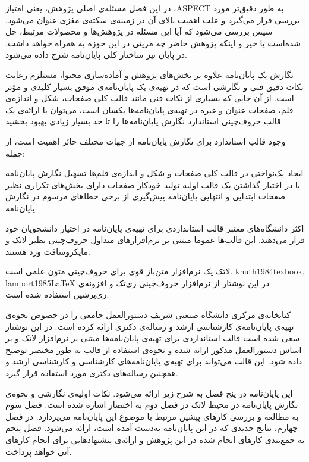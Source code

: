 

در این فصل مسئله‌ی اصلی پژوهش، یعنی امتیاز ،ASPECT به طور دقیق‌تر مورد بررسی قرار می‌گیرد و علت اهمیت بالای آن در زمینه‌ی سکته‌ی مغزی عنوان می‌شود.
سپس بررسی می‌شود که آیا این مسئله در پژوهش‌ها و محصولات مرتبط، حل شده‌است یا خیر و اینکه پژوهش حاضر چه مزیتی در این حوزه به همراه خواهد داشت.
در پایان نیز ساختار کلی پایان‌نامه شرج داده می‌شود.


نگارش یک پایان‌نامه‌ علاوه بر بخش‌های پژوهش و آماده‌سازی محتوا،
مستلزم رعایت نکات دقیق فنی و نگارشی است 
که در تهیه‌ی یک پایان‌نامه‌ی موفق بسیار کلیدی و مؤثر است.
از آن جایی که بسیاری از نکات فنی مانند قالب کلی صفحات، شکل و اندازه‌ی قلم، 
صفحات عنوان و غیره در تهیه‌ی پایان‌نامه‌ها یکسان است،
می‌توان با ارائه‌ی یک قالب حروف‌چینی استاندارد 
نگارش پایان‌نامه‌ها را تا حد بسیار زیادی بهبود بخشید.


وجود قالب استاندارد برای نگارش پایان‌نامه از جهات مختلف حائز اهمیت است، از جمله:

ایجاد یک‌نواختی در قالب کلی صفحات و شکل و اندازه‌ی قلم‌ها
تسهیل نگارش پایان‌نامه با در اختیار گذاشتن یک قالب اولیه 
تولید خودکار صفحات دارای بخش‌های تکراری نظیر صفحات ابتدایی و انتهایی پایان‌نامه
پیش‌گیری از برخی خطاهای مرسوم در نگارش پایان‌نامه


اکثر دانشگاه‌های معتبر قالب استانداردی برای تهیه‌ی پایان‌نامه در اختیار دانشجویان خود قرار می‌دهند.
این قالب‌ها عموما مبتنی بر نرم‌افزارهای متداول حروف‌چینی نظیر لاتک و مایکروسافت ورد هستند.

 لاتک یک نرم‌افزار متن‌باز قوی برای حروف‌چینی متون علمی است.
 {knuth1984texbook, lamport1985LaTeX} 
در این نوشتار از نرم‌افزار حروف‌چینی زی‌تک 
 و افزونه‌ی زی‌پرشین
 استفاده شده است.



کتابخانه‌ی مرکزی دانشگاه صنعتی شریف دستورالعمل جامعی را در خصوص
نحوه‌ی تهیه‌ی پایان‌نامه‌ی کارشناسی ارشد و رساله‌ی دکتری ارائه کرده است.
در این نوشتار سعی شده است قالب استانداردی برای تهیه‌ی پایان‌نامه‌ها مبتنی بر نرم‌افزار لاتک و
بر اساس دستورالعمل مذکور ارائه شده و
نحوه‌ی استفاده از قالب به طور مختصر توضیح داده شود.
این قالب  می‌تواند برای تهیه‌ی پایان‌نامه‌های کارشناسی و کارشناسی ارشد 
و همچنین رساله‌ها‌ی دکتری مورد استفاده قرار گیرد.


این پایان‌نامه در پنج فصل به شرح زیر ارائه می‌شود.
نکات اولیه‌ی نگارشی و نحوه‌ی نگارش پایان‌نامه در محیط لاتک در  فصل دوم به اختصار اشاره شده است. 
فصل سوم به مطالعه و بررسی کارهای پیشین مرتبط با موضوع این پایان‌نامه می‌پردازد.
در فصل چهارم، نتایج جدیدی که در این پایان‌نامه به‌دست آمده است، ارائه می‌شود.
فصل پنجم به جمع‌بندی کارهای انجام شده در این پژوهش و ارائه‌ی پیشنهادهایی برای انجام کارهای آتی خواهد پرداخت.